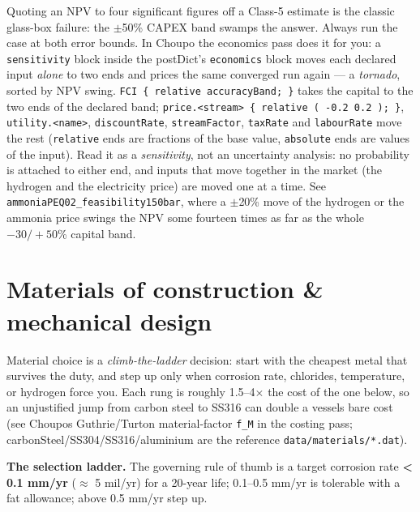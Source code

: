 \documentclass[11pt,a4paper]{article}
\begin{document}
Quoting an NPV to four significant figures off a Class-5 estimate is the
classic glass-box failure: the \(\pm\)50\% CAPEX band swamps the answer.
Always run the case at both error bounds. In Choupo the economics pass
does it for you: a \texttt{sensitivity} block inside the postDict's
\texttt{economics} block moves each declared input \emph{alone} to two
ends and prices the same converged run again --- a \emph{tornado}, sorted
by NPV swing. \texttt{FCI \{ relative accuracyBand; \}} takes the capital
to the two ends of the declared band;
\texttt{price.<stream> \{ relative ( -0.2 0.2 ); \}},
\texttt{utility.<name>}, \texttt{discountRate},
\texttt{streamFactor}, \texttt{taxRate} and \texttt{labourRate} move the
rest (\texttt{relative} ends are fractions of the base value,
\texttt{absolute} ends are values of the input). Read it as a
\emph{sensitivity}, not an uncertainty analysis: no probability is
attached to either end, and inputs that move together in the market (the
hydrogen and the electricity price) are moved one at a time. See
\texttt{ammoniaPEQ02\_feasibility150bar}, where a \(\pm\)20\% move of
the hydrogen or the ammonia price swings the NPV some fourteen times as
far as the whole \(-30/+50\)\% capital band.

\hypertarget{materials-of-construction--mechanical-design}{%
\section{Materials of construction \& mechanical
design}\label{materials-of-construction--mechanical-design}}

Material choice is a \emph{climb-the-ladder} decision: start with the
cheapest metal that survives the duty, and step up only when corrosion
rate, chlorides, temperature, or hydrogen force you. Each rung is
roughly 1.5--4\(\times\) the cost of the one below, so an unjustified jump from
carbon steel to SS316 can double a vessel\textquotesingle s bare cost
(see Choupo\textquotesingle s Guthrie/Turton material-factor
\texttt{f\_M} in the costing pass; carbonSteel/SS304/SS316/aluminium are
the reference \texttt{data/materials/*.dat}).

\textbf{The selection ladder.} The governing rule of thumb is a target
corrosion rate \textbf{\textless{} 0.1 mm/yr} (\(\approx\) 5 mil/yr) for a 20-year
life; 0.1--0.5 mm/yr is tolerable with a fat allowance; above 0.5 mm/yr
step up.
\end{document}
